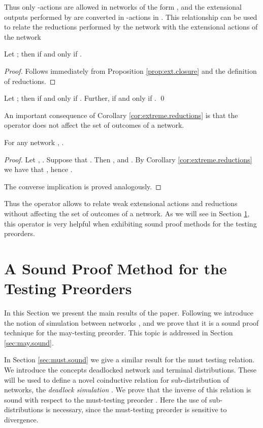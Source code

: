 \documentclass{LMCS}
\begin{document}
\noindent Thus only -actions are allowed in networks of the form 
, and the extensional outputs performed 
by  are converted in -actions in . 
This relationship can be used to relate the reductions performed 
by the network  with the extensional actions of the 
network 

\begin{prop}
Let ; then 
 if and 
only if .
\end{prop} 

\begin{proof}
Follows immediately from Proposition \ref{prop:ext.closure} 
and the definition of reductions.
\end{proof}

\begin{cor}
\label{cor:extreme.reductions}
Let ; then 
 if 
and only if . 
Further,  
if and only if . 
\qed
\end{cor}

An important consequence of Corollary \ref{cor:extreme.reductions} 
is that the operator  does not affect the 
set of outcomes of a network. 
\begin{cor}
\label{cor:closure.results}
For any network , .
\end{cor}

\begin{proof}
Let , . 
Suppose that . Then 
, and 
. 
By Corollary \ref{cor:extreme.reductions} we have 
that , 
hence . 

The converse implication is proved analogously.
\end{proof}

\noindent Thus the operator  allows to relate weak 
extensional actions and reductions without affecting the 
set of outcomes of a network. As we will see in 
Section \ref{sec:soundness}, this operator is very 
helpful when exhibiting sound proof methods for the 
testing preorders.

\section{A Sound Proof Method for the Testing Preorders}

\label{sec:soundness}
In this Section we present the main results of the paper. 
Following \cite{DGHM09full} we introduce the notion of 
simulation between networks , and 
we prove that it is a sound proof technique for the 
may-testing preorder. This topic is addressed in Section 
\ref{sec:may.sound}.

In Section \ref{sec:must.sound} we give a similar 
result for the must testing relation. We introduce the 
concepts deadlocked network and terminal distributions. 
These will be used to define a novel coinductive 
relation for sub-distribution of networks, the \emph{deadlock 
simulation} . We prove that the inverse of this 
relation is sound with respect to the must-testing preorder 
. Here the use of sub-distributions is necessary, 
since the must-testing preorder is sensitive to divergence.
\end{document}
